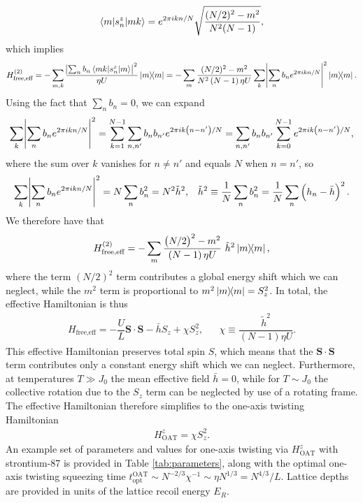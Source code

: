 \documentclass[aps,notitlepage,nofootinbib,11pt]{revtex4-1}
\renewcommand{\t}{\text} %
\newcommand{\f}[2]{\dfrac{#1}{#2}} %
\newcommand{\p}[1]{\left(#1\right)} %
\renewcommand{\v}{\bm} %
\renewcommand{\c}{\cdot} %
\newcommand{\bk}{\braket} %
\newcommand{\1}{\hat{\mathds{1}}}
\begin{document}
\begin{align}
  \bk{m|s_n^z|mk} = e^{2\pi i k n/N} \sqrt{\f{(N/2)^2-m^2}{N^2 (N-1)}},
\end{align}
which implies
\begin{align}
  H_{\t{free,eff}}^{(2)}
  = -\sum_{m,k}
  \frac{\abs{\sum_n b_n \bk{mk|s_n^z|m}}^2}{\eta U} \op{m}
  = -\sum_m \f{(N/2)^2-m^2}{N^2\p{N-1}\eta U}
  \sum_k \abs{\sum_n b_n e^{2\pi ikn/N}}^2 \op{m}.
\end{align}
Using the fact that $\sum_nb_n=0$, we can expand
\begin{align}
  \sum_k \abs{\sum_n b_n e^{2\pi ikn/N}}^2
  = \sum_{k=1}^{N-1} \sum_{n,n'} b_n b_{n'} e^{2\pi ik\p{n-n'}/N}
  = \sum_{n,n'} b_n b_{n'} \sum_{k=0}^{N-1} e^{2\pi ik\p{n-n'}/N},
\end{align}
where the sum over $k$ vanishes for $n\ne n'$ and equals $N$ when
$n=n'$, so
\begin{align}
  \sum_k \abs{\sum_n b_n e^{2\pi ikn/N}}^2
  = N \sum_n b_n^2 = N^2 \tilde h^2,
  &&
  \tilde h^2 \equiv \f1N \sum_n b_n^2 = \f1N \sum_n \p{h_n - \bar h}^2.
  \label{eq:sum_knn}
\end{align}
We therefore have that
\begin{align}
  H_{\t{free,eff}}^{(2)}
  = -\sum_m \f{\p{N/2}^2-m^2}{\p{N-1}\eta U}~ \tilde h^2 \op{m},
\end{align}
where the term $\p{N/2}^2$ term contributes a global energy shift
which we can neglect, while the $m^2$ term is proportional to
$m^2\op{m}=S_z^2$.  In total, the effective Hamiltonian is thus
\begin{align}
  H_{\t{free,eff}}
  = -\f{U}{L} \v S \c \v S - \bar h S_z + \chi S_z^2,
  &&
  \chi \equiv \f{\tilde h^2}{\p{N-1}\eta U}.
\end{align}
This effective Hamiltonian preserves total spin $S$, which means that
the $\v S\c\v S$ term contributes only a constant energy shift which
we can neglect.  Furthermore, at temperatures $T\gg J_0$ the mean
effective field $\bar h=0$, while for $T\sim J_0$ the collective
rotation due to the $S_z$ term can be neglected by use of a rotating
frame.  The effective Hamiltonian therefore simplifies to the one-axis
twisting Hamiltonian
\begin{align}
  H_{\t{OAT}}^z = \chi S_z^2.
  \label{eq:H_OAT}
\end{align}
An example set of parameters and values for one-axis twisting via
$H_{\t{OAT}}^z$ with strontium-87 is provided in Table
\ref{tab:parameters}, along with the optimal one-axis twisting
squeezing time
$t_{\t{opt}}^{\t{OAT}}\sim N^{-2/3}\chi^{-1}\sim\eta
N^{1/3}=N^{4/3}/L$.  Lattice depths are provided in units of the
lattice recoil energy $E_R$.
\end{document}
